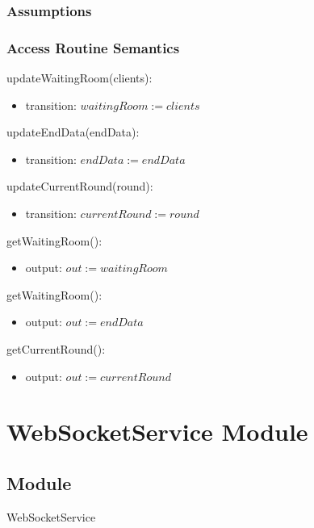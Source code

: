 \documentclass[12pt, titlepage]{article}
\begin{document}
\subsubsection{Assumptions}


\subsubsection{Access Routine Semantics}

\noindent updateWaitingRoom(clients):
\begin{itemize}
\item transition: $waitingRoom := clients$
\end{itemize}

\noindent updateEndData(endData):
\begin{itemize}
\item transition: $endData := endData$
\end{itemize}

\noindent updateCurrentRound(round):
\begin{itemize}
\item transition: $currentRound := round$
\end{itemize}

\noindent getWaitingRoom():
\begin{itemize}
\item output: $out := waitingRoom$
\end{itemize}

\noindent getWaitingRoom():
\begin{itemize}
\item output: $out := endData$
\end{itemize}

\noindent getCurrentRound():
\begin{itemize}
\item output: $out := currentRound$
\end{itemize}


\newpage

\section{WebSocketService Module} \label{WebSocketService}


\subsection{Module}

WebSocketService
\end{document}
